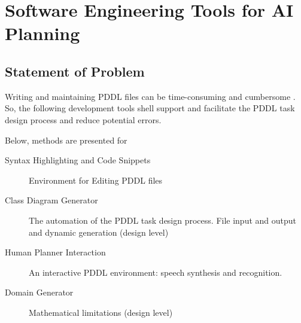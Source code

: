 \documentclass[11pt]{report}
\begin{document}
\chapter{Software Engineering Tools for AI Planning}
\label{sec-4}
\begin{center}
\end{center}

\section{Statement of Problem}
\label{sec-4-1}
Writing and maintaining PDDL files can be time-consuming and
cumbersome \textcite{li2012translating}. So, the following development
tools shell support and facilitate the PDDL task design process and
reduce potential errors.

Below, methods are presented for

\begin{description}
\item[{Syntax Highlighting and Code Snippets}] Environment for Editing
PDDL files
\item[{Class Diagram Generator}] The automation of the PDDL task design process. File
input and output and dynamic generation (design level)
\item[{Human Planner Interaction}] An interactive PDDL environment: speech synthesis and
recognition.
\item[{Domain Generator}] Mathematical limitations (design level)
\end{description}
\end{document}
